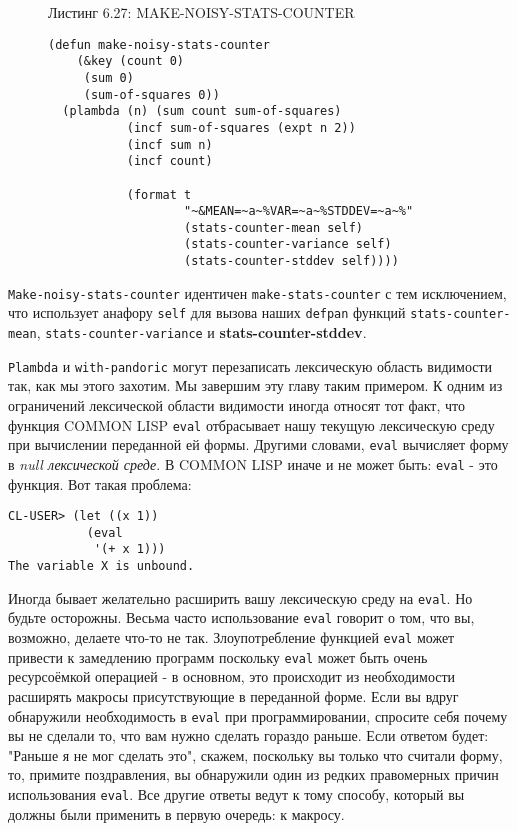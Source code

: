 \begin{figure}Листинг 6.27: MAKE-NOISY-STATS-COUNTER\label{listing_6.27}
\listbegin
\begin{verbatim}
(defun make-noisy-stats-counter
    (&key (count 0)
     (sum 0)
     (sum-of-squares 0))
  (plambda (n) (sum count sum-of-squares)
           (incf sum-of-squares (expt n 2))
           (incf sum n)
           (incf count)
           
           (format t
                   "~&MEAN=~a~%VAR=~a~%STDDEV=~a~%"
                   (stats-counter-mean self)
                   (stats-counter-variance self)
                   (stats-counter-stddev self))))
\end{verbatim}
\listend
\end{figure}

\verb"Make-noisy-stats-counter" идентичен \verb"make-stats-counter" с тем исключением, что использует анафору \verb"self" для вызова наших \verb"defpan" функций \verb"stats-counter-mean", \verb"stats-counter-variance" и {\Eng\textbf{stats\--\-coun\-ter\--\-std\-dev}}.

\verb"Plambda" и \verb"with-pandoric" могут перезаписать лексическую область видимости так, как мы этого захотим. Мы завершим эту главу таким примером. К одним из ограничений лексической области видимости иногда относят тот факт, что функция COMMON LISP \verb"eval" отбрасывает нашу текущую лексическую среду при вычислении переданной ей формы. Другими словами, \verb"eval" вычисляет форму в \emph{null лексической среде}. В COMMON LISP иначе и не может быть: \verb"eval" - это функция. Вот такая проблема:

\begin{verbatim}
CL-USER> (let ((x 1))
           (eval
            '(+ x 1)))
The variable X is unbound.
\end{verbatim}

Иногда бывает желательно расширить вашу лексическую среду на \verb"eval". Но будьте осторожны. Весьма часто использование \verb"eval" говорит о том, что вы, возможно, делаете что-то не так. Злоупотребление функцией \verb"eval" может привести к замедлению программ поскольку \verb"eval" может быть очень ресурсоёмкой операцией - в основном, это происходит из необходимости расширять макросы присутствующие в переданной форме. Если вы вдруг обнаружили необходимость в \verb"eval" при программировании, спросите себя почему вы не сделали то, что вам нужно сделать гораздо раньше. Если ответом будет: "Раньше я не мог сделать это", скажем, поскольку вы только что считали форму, то, примите поздравления, вы обнаружили один из редких правомерных причин использования \verb"eval". Все другие ответы ведут к тому способу, который вы должны были применить в первую очередь: к макросу.

